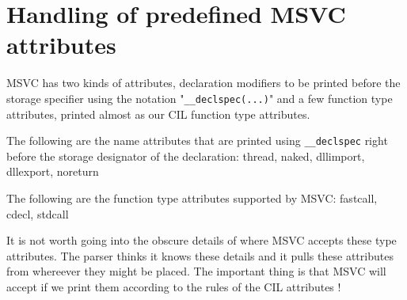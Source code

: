 \documentclass{book}
\def\t#1{{\tt #1}}
\begin{document}
\section{Handling of predefined MSVC attributes}

  MSVC has two kinds of attributes, declaration modifiers to be printed before
  the storage specifier using the notation "\t{\_\_declspec(...)}" and a few
  function type attributes, printed almost as our CIL function type
  attributes. 

   The following are the name attributes that are printed using
   \t{\_\_declspec} right before the storage designator of the declaration:
   thread, naked, dllimport, dllexport, noreturn


   The following are the function type attributes supported by MSVC: 
   fastcall, cdecl, stdcall

   It is not worth going into the obscure details of where MSVC accepts these
   type attributes. The parser thinks it knows these details and it pulls
   these attributes from whereever they might be placed. The important thing
   is that MSVC will accept if we print them according to the rules of the CIL
   attributes ! 
 
 
\end{document}
